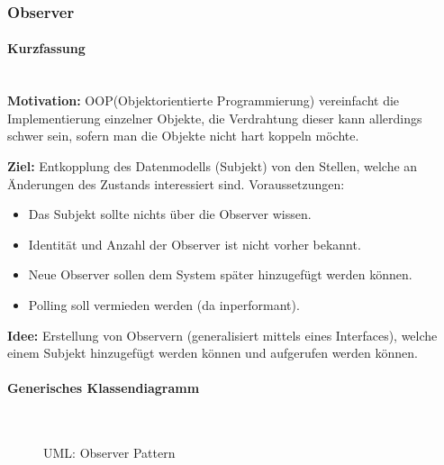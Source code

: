 \documentclass[
    ngerman,
    color=3b,
    summary,
    boxarc,
    main,
]{rubos-tuda-template}
\begin{document}
\subsubsection{Observer}
\paragraph{Kurzfassung}\mbox{}\\
\textbf{Motivation:} OOP(Objektorientierte Programmierung) vereinfacht die Implementierung einzelner Objekte, die Verdrahtung dieser kann allerdings schwer sein, sofern man die Objekte nicht hart koppeln möchte.

\textbf{Ziel:} Entkopplung des Datenmodells (Subjekt) von den Stellen, welche an Änderungen des Zustands interessiert sind. Voraussetzungen:
\begin{itemize}
    \item Das Subjekt sollte nichts über die Observer wissen.
    \item Identität und Anzahl der Observer ist nicht vorher bekannt.
    \item Neue Observer sollen dem System später hinzugefügt werden können.
    \item Polling soll vermieden werden (da inperformant).
\end{itemize}

\textbf{Idee:} Erstellung von Observern (generalisiert mittels eines Interfaces), welche einem Subjekt hinzugefügt werden können und aufgerufen werden können.

\paragraph{Generisches Klassendiagramm}\mbox{}\\
\begin{figure}[ht]
    \centering
    \caption{UML: Observer Pattern}
\end{figure}
\end{document}
